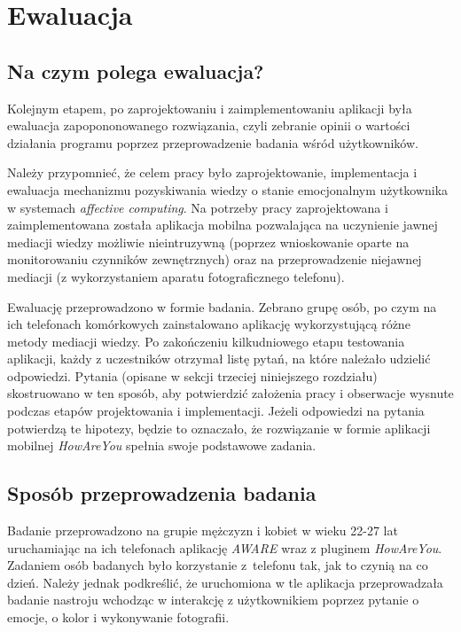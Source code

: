 \chapter{Ewaluacja}
\label{cha:ewaluacja}


\section{Na czym polega ewaluacja?}
\label{sec:naCzymPolegaEwaluacja}

Kolejnym etapem, po zaprojektowaniu i zaimplementowaniu aplikacji była ewaluacja zapopononowanego rozwiązania, czyli zebranie opinii o wartości działania programu poprzez przeprowadzenie badania wśród użytkowników. 

Należy przypomnieć, że celem pracy było zaprojektowanie, implementacja i ewaluacja mechanizmu pozyskiwania wiedzy o  stanie emocjonalnym użytkownika w systemach \textit{affective computing}. Na potrzeby pracy zaprojektowana i zaimplementowana została aplikacja mobilna pozwalająca na uczynienie jawnej mediacji wiedzy możliwie nieintruzywną (poprzez wnioskowanie oparte na monitorowaniu czynników zewnętrznych) oraz na przeprowadzenie niejawnej mediacji (z wykorzystaniem aparatu fotograficznego telefonu). 

Ewaluację przeprowadzono w formie badania. Zebrano grupę osób, po czym na ich telefonach komórkowych zainstalowano aplikację wykorzystującą różne metody mediacji wiedzy. Po zakończeniu kilkudniowego etapu 
testowania aplikacji, każdy z uczestników otrzymał listę pytań, na które należało udzielić odpowiedzi. Pytania (opisane w sekcji trzeciej niniejszego rozdziału) skostruowano w ten sposób, aby potwierdzić 
założenia pracy i obserwacje wysnute podczas etapów projektowania i implementacji. Jeżeli odpowiedzi na pytania potwierdzą te hipotezy, będzie to oznaczało, że rozwiązanie w formie aplikacji mobilnej \textit{HowAreYou} spełnia swoje podstawowe zadania.


\section{Sposób przeprowadzenia badania}
\label{sec:sposobPrzeprowadzeniaBadania}

Badanie przeprowadzono na grupie mężczyzn i kobiet w wieku 22-27 lat uruchamiając na ich telefonach aplikację \textit{AWARE} wraz z pluginem \textit{HowAreYou}. Zadaniem osób badanych było korzystanie z~telefonu tak, jak to czynią na co dzień. Należy jednak podkreślić, że uruchomiona w tle aplikacja przeprowadzała badanie nastroju wchodząc w interakcję z użytkownikiem poprzez pytanie o emocje, o kolor i wykonywanie fotografii.

